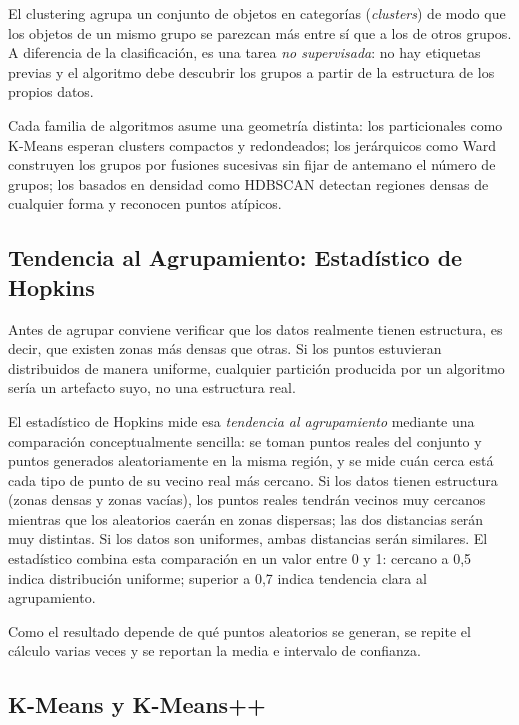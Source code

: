 El clustering agrupa un conjunto de objetos en categorías (\textit{clusters}) de modo que los objetos de un mismo grupo se parezcan más entre sí que a los de otros grupos. A diferencia de la clasificación, es una tarea \textit{no supervisada}: no hay etiquetas previas y el algoritmo debe descubrir los grupos a partir de la estructura de los propios datos.

Cada familia de algoritmos asume una geometría distinta: los particionales como K-Means esperan clusters compactos y redondeados; los jerárquicos como Ward construyen los grupos por fusiones sucesivas sin fijar de antemano el número de grupos; los basados en densidad como HDBSCAN detectan regiones densas de cualquier forma y reconocen puntos atípicos.

\subsection{Tendencia al Agrupamiento: Estadístico de Hopkins}
\label{subsec:hopkins}

Antes de agrupar conviene verificar que los datos realmente tienen estructura, es decir, que existen zonas más densas que otras. Si los puntos estuvieran distribuidos de manera uniforme, cualquier partición producida por un algoritmo sería un artefacto suyo, no una estructura real.

El estadístico de Hopkins \parencite{lawson_1990_hopkins} mide esa \textit{tendencia al agrupamiento} mediante una comparación conceptualmente sencilla: se toman puntos reales del conjunto y puntos generados aleatoriamente en la misma región, y se mide cuán cerca está cada tipo de punto de su vecino real más cercano. Si los datos tienen estructura (zonas densas y zonas vacías), los puntos reales tendrán vecinos muy cercanos mientras que los aleatorios caerán en zonas dispersas; las dos distancias serán muy distintas. Si los datos son uniformes, ambas distancias serán similares. El estadístico combina esta comparación en un valor entre 0 y 1: cercano a 0,5 indica distribución uniforme; superior a 0,7 indica tendencia clara al agrupamiento.

Como el resultado depende de qué puntos aleatorios se generan, se repite el cálculo varias veces y se reportan la media e intervalo de confianza.

\subsection{K-Means y K-Means++}
\label{subsec:kmeans}

